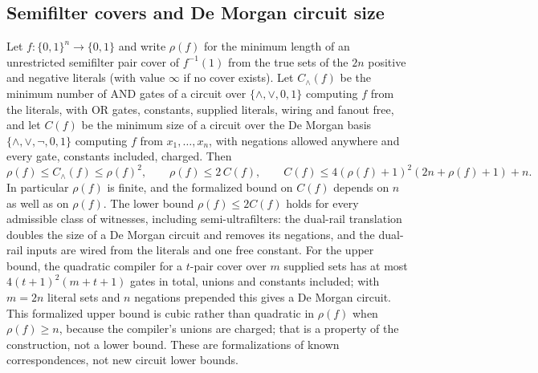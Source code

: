 \begin{result}
\subsection{Semifilter covers and De Morgan circuit size}
Let $f:\{0,1\}^n\to\{0,1\}$ and write $\rho(f)$ for the minimum length of an
unrestricted semifilter pair cover of $f^{-1}(1)$ from the true sets of the
$2n$ positive and negative literals (with value $\infty$ if no cover exists).
Let $C_\wedge(f)$ be the minimum number of AND gates of a circuit over
$\{\wedge,\vee,0,1\}$ computing $f$ from the literals, with OR gates, constants,
supplied literals, wiring and fanout free, and let $C(f)$ be the minimum size of
a circuit over the De Morgan basis $\{\wedge,\vee,\neg,0,1\}$ computing $f$ from
$x_1,\ldots,x_n$, with negations allowed anywhere and every gate, constants
included, charged. Then
\[
\rho(f)\le C_\wedge(f)\le\rho(f)^2,
\qquad
\rho(f)\le 2\,C(f),
\qquad
C(f)\le 4(\rho(f)+1)^2(2n+\rho(f)+1)+n .
\]
In particular $\rho(f)$ is finite, and the formalized bound on $C(f)$ depends on
$n$ as well as on $\rho(f)$. The lower bound $\rho(f)\le 2C(f)$ holds for
every admissible class of witnesses, including semi-ultrafilters: the
dual-rail translation doubles the size of a De Morgan circuit and removes its
negations, and the dual-rail inputs are wired from the literals and one free
constant. For the upper bound, the quadratic compiler for a $t$-pair cover over
$m$ supplied sets has at most $4(t+1)^2(m+t+1)$ gates in total, unions and
constants included; with $m=2n$ literal sets and $n$ negations prepended this
gives a De Morgan circuit. This formalized upper bound is cubic rather than
quadratic in $\rho(f)$ when $\rho(f)\ge n$, because the compiler's unions are
charged; that is a property of the construction, not a lower bound. These are
formalizations of known correspondences, not new circuit lower bounds.
\citep{CavalarOliveira2025,Goldschlager1977,Razborov1989}
\end{result}

